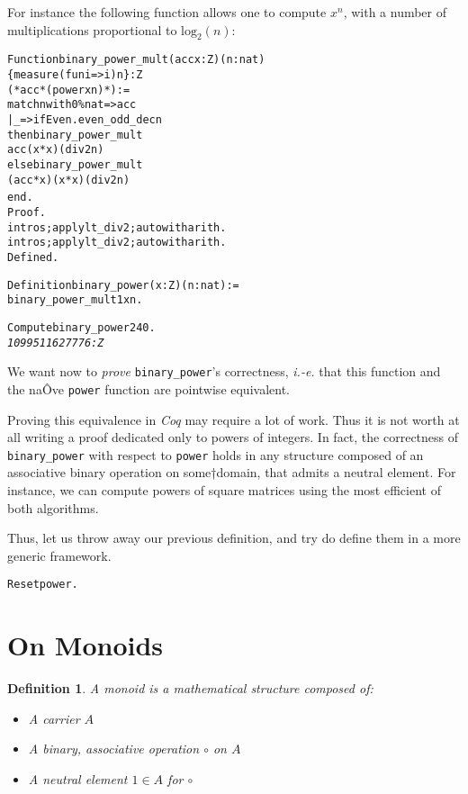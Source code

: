 \documentclass[a4]{report}
\newcommand{\coq}{\mbox{\emph{Coq}}}
\newtheorem{definition}{Definition}[chapter]
\begin{document}
For instance the following function allows one to compute $x^n$, 
with a number of multiplications proportional to $\textrm{log}_2(n)$:


  \begin{alltt}
{Function} binary_power_mult (acc x:Z){(n:nat)}
                \{measure (fun i=>i) n\} : Z
{(* acc * (power x n) *)} :=
 match {{n}} with 0\%nat => acc
             | _ => if Even.even_odd_dec n
                    then  binary_power_mult  
                          acc (x * x) {(div2 n)}
                    else  binary_power_mult 
                         (acc * x) (x * x) {(div2 n)}
  end.{
Proof.
  intros;apply lt_div2; auto with arith.
  intros;apply lt_div2; auto with arith.}
Defined.

Definition binary_power (x:Z)(n:nat) := 
        binary_power_mult 1 x n.

Compute binary_power 2 40.\color{answercolor}\it
1099511627776: Z
\end{alltt}

We want now to \emph{prove} \texttt{binary\_power}'s correctness, \emph{i.-e.}
that this function and the naÔve \texttt{power} function are pointwise
equivalent.

Proving this equivalence in {\coq} may require a lot of work. 
Thus it is not worth at all writing  a proof dedicated only to powers of
integers. In fact, the correctness of \texttt{binary\_power} with respect to
\texttt{power} holds in any structure composed of an associative binary 
operation on some†domain, that admits a neutral element.
For instance, we can compute powers of square matrices  using the most efficient of both algorithms.


Thus, let us throw away our previous definition, and try do define them
in a more generic framework.

\begin{alltt}
Reset power. 
\end{alltt}


\section{On Monoids}\label{on-monoids}

\begin{definition}
A \emph{monoid} is a mathematical structure composed of:
\begin{itemize}
\item A carrier $A$ 
\item A binary, associative  operation $\circ$ on $A$
\item A neutral element $1\in A$ for $\circ$
\end{itemize}
\end{definition}
\end{document}

